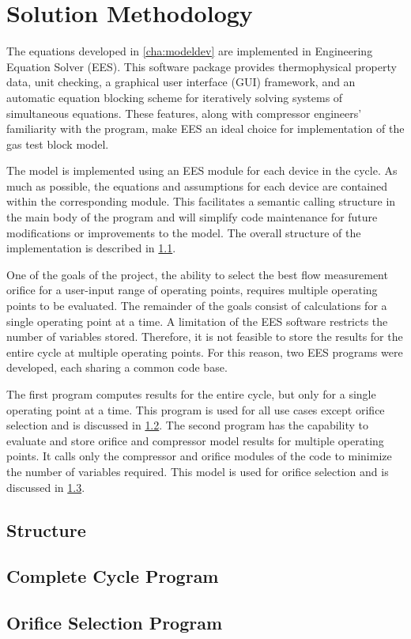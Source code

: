 \chapter{Solution Methodology} \label{cha:solnmethod}

The equations developed in \cref{cha:modeldev} are implemented in
Engineering Equation Solver (EES). 
This software package provides thermophysical property data, unit checking, 
a graphical user interface (GUI) framework, and an automatic equation 
blocking scheme for iteratively solving systems of simultaneous equations. 
These features, along with compressor engineers' familiarity with the program, 
make EES an ideal choice for implementation of the gas test block model.

The model is implemented using an EES module for each device in the cycle. 
As much as possible, the equations and assumptions for each device are contained
within the corresponding module.
This facilitates a semantic calling structure in the main body of the program 
and will simplify code maintenance for future modifications or improvements 
to the model.
The overall structure of the implementation is described in \cref{sec:Overall}.

One of the goals of the project, the ability to select the best flow measurement
orifice for a user-input range of operating points, requires multiple operating points
to be evaluated.
The remainder of the goals consist of calculations for a single operating point at a time.
A limitation of the EES software restricts the number of variables stored.
Therefore, it is not feasible to store the results for the entire cycle at multiple operating points.
For this reason, two EES programs were developed, each sharing a common code base. 

The first program computes results for the entire cycle, but only 
for a single operating point at a time.
This program is used for all use cases except orifice selection
and is discussed in \cref{sec:MainModel}.
The second program has the capability to evaluate and store orifice and 
compressor model results for multiple operating points.
It calls only the compressor and orifice modules of the code to minimize the number of variables required.
This model is used for orifice selection and is discussed in \cref{sec:OrifSelect}.

\section{Structure} \label{sec:Overall}

\section{Complete Cycle Program} \label{sec:MainModel}

\section{Orifice Selection Program} \label{sec:OrifSelect}